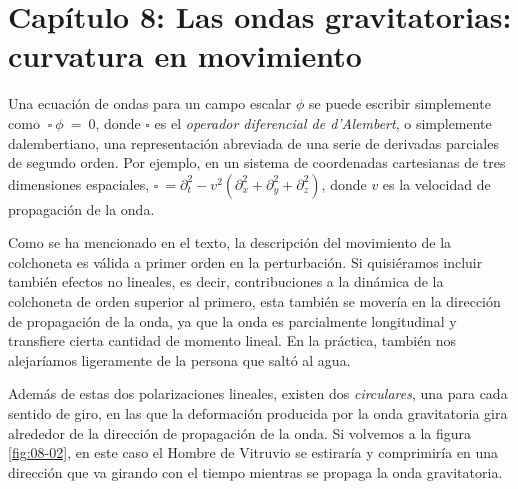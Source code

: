 \section*{Capítulo 8: Las ondas gravitatorias: curvatura en movimiento}
\begin{description}[style=multiline,leftmargin=2em,labelwidth=1.5em]

\item[1.]\hypertarget{note:08-01}{}Una ecuación de ondas para un campo escalar \(\phi\) se puede escribir simplemente como \(\ \square\ \phi\  = \ 0\), donde \(\square\) es el \emph{operador diferencial de d'Alembert}, o simplemente dalembertiano, una representación abreviada de una serie de derivadas parciales de segundo orden. Por ejemplo, en un sistema de coordenadas cartesianas de tres dimensiones espaciales, \(\square\  = \partial_{t}^{2} - v^{2}(\partial_{x}^{2} + \partial_{y}^{2} + \partial_{z}^{2})\), donde \(v\) es la velocidad de propagación de la onda.

\item[2.]\hypertarget{note:08-02}{}Como se ha mencionado en el texto, la descripción del movimiento de la colchoneta es válida a primer orden en la perturbación. Si quisiéramos incluir también efectos no lineales, es decir, contribuciones a la dinámica de la colchoneta de orden superior al primero, esta también se movería en la dirección de propagación de la onda, ya que la onda es parcialmente longitudinal y transfiere cierta cantidad de momento lineal. En la práctica, también nos alejaríamos ligeramente de la persona que saltó al agua.

\item[3.]\hypertarget{note:08-03}{}Además de estas dos polarizaciones lineales, existen dos \emph{circulares}, una para cada sentido de giro, en las que la deformación producida por la onda gravitatoria gira alrededor de la dirección de propagación de la onda. Si volvemos a la figura \ref{fig:08-02}, en este caso el Hombre de Vitruvio se estiraría y comprimiría en una dirección que va girando con el tiempo mientras se propaga la onda gravitatoria.


\end{description}
